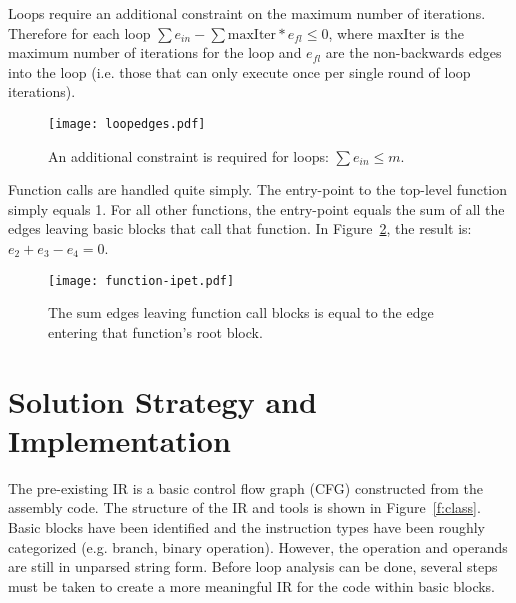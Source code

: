 

Loops require an additional constraint on the maximum number of iterations. Therefore for each loop $\sum e_{in} - \sum \mathrm{maxIter}*e_{fl} \le 0$, where $\mathrm{maxIter}$ is the maximum number of iterations for the loop and $e_{fl}$ are the non-backwards edges into the loop (i.e. those that can only execute once per single round of loop iterations).


\begin{figure}[h]
\centering
\texttt{[image: loopedges.pdf]}
\caption{An additional constraint is required for loops: $\sum e_{in} \leq m$.} 
\label{f:loopedges}
\end{figure}


Function calls are handled quite simply. The entry-point to the top-level function simply equals 1. For all other functions, the entry-point equals the sum of all the edges leaving basic blocks that call that function. In Figure~\ref{f:function-ipet}, the result is: $e_2+e_3-e_4 = 0$.

\begin{figure}[h]
\centering
\texttt{[image: function-ipet.pdf]}
\caption{The sum edges leaving function call blocks is equal to the edge entering that function's root block.} 
\label{f:function-ipet}
\end{figure}
 


\section{Solution Strategy and Implementation}

The pre-existing IR is a basic control flow graph (CFG) constructed from the assembly code. The structure of the IR and tools is shown in Figure~\ref{f:class}. Basic blocks have been identified and the instruction types have been roughly categorized (e.g. branch, binary operation). However, the operation and operands are still in unparsed string form. Before loop analysis can be done, several steps must be taken to create a more meaningful IR for the code within basic blocks.

